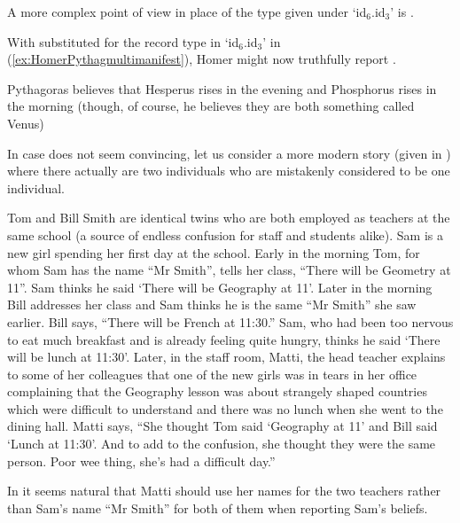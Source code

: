 A more complex point of view in place of the type given under `id$_6$.id$_3$'
is \nexteg{}.
\begin{ex} 
\end{ex} 
With \preveg{} substituted for the record type in `id$_6$.id$_3$' in
(\ref{ex:HomerPythagmultimanifest}), Homer might now truthfully report
\nexteg{}.
\begin{ex} 
Pythagoras believes that Hesperus rises in the evening and Phosphorus
rises in the morning (though, of course, he believes they are both
something called Venus) 
\end{ex} 
In case \preveg{} does not seem convincing, let us consider a more
modern story (given in \nexteg{}) where there actually are two
individuals who are mistakenly considered to be one individual.
\begin{ex} 
Tom and Bill Smith are identical twins who are both employed as
teachers at the same school (a source of endless confusion for staff
and students alike).  Sam is a new girl spending her first day at the
school.  Early in the morning Tom, for whom Sam has the name ``Mr
Smith'', tells her class, ``There will be Geometry at 11''.  Sam
thinks he said `There will be Geography at 11'.  Later in the
morning Bill addresses her class and Sam thinks he is the same
``Mr Smith'' she saw earlier.  Bill says, ``There will be French
at 11:30.'' Sam, who had been too nervous to eat much breakfast and is
already feeling quite hungry, thinks he said `There will be lunch at
11:30'.  Later, in the staff room, Matti, the head teacher explains
to some of her colleagues that one of the new girls was in tears in
her office complaining that the Geography lesson was about strangely
shaped countries which were difficult to understand and there was no
lunch when she went to the dining hall.  Matti says, ``She thought Tom
said `Geography at 11' and Bill said `Lunch at 11:30'.  And to add to
the confusion, she thought they were the same person.  Poor wee thing,
she's had a difficult day.'' 
\end{ex} 
In \preveg{} it seems natural that Matti should use her names for the
two teachers rather than Sam's name ``Mr Smith'' for both
of them when reporting Sam's beliefs.
  
